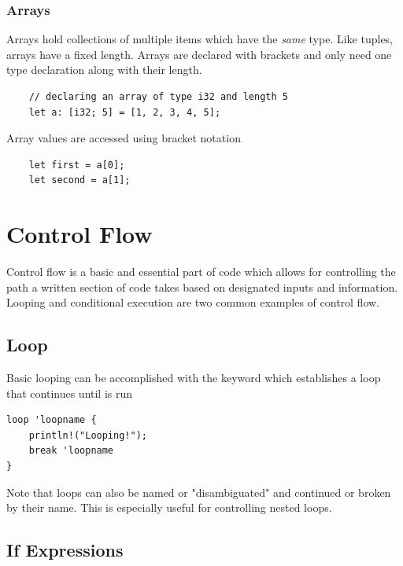 \documentclass[]{article}
\begin{document}
\subsubsection{Arrays}

Arrays hold collections of multiple items which have the \emph{same} type.
Like tuples, arrays have a fixed length.
Arrays are declared with brackets and only need one type declaration along with their length.
\begin{verbatim}
    // declaring an array of type i32 and length 5
    let a: [i32; 5] = [1, 2, 3, 4, 5];
\end{verbatim}
Array values are accessed using bracket notation
\begin{verbatim}
    let first = a[0];
    let second = a[1];
\end{verbatim}
\section{Control Flow}
Control flow is a basic and essential part of code which allows for controlling the path a written section of code takes based on designated inputs and information.
Looping and conditional execution are two common examples of control flow.
\subsection{Loop}

Basic looping can be accomplished with the  keyword which establishes a loop that continues until  is run
\begin{verbatim}
loop 'loopname { 
    println!("Looping!");
    break 'loopname
}
\end{verbatim}
Note that loops can also be named or "disambiguated" and continued or broken by their name.
This is especially useful for controlling nested loops.
\subsection{If Expressions}
\end{document}

